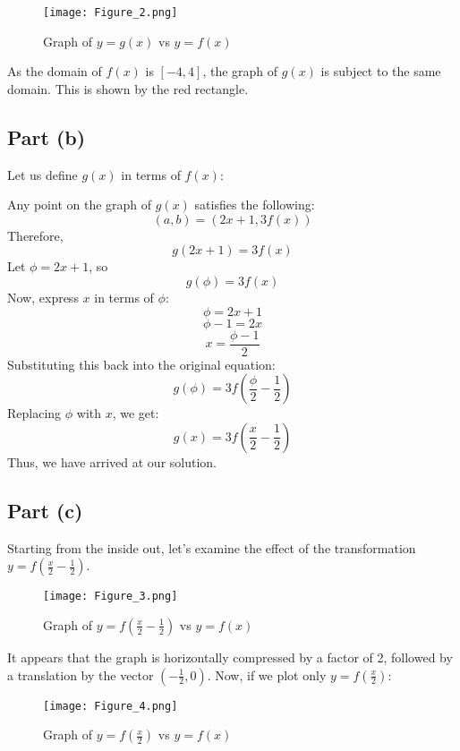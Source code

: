 \documentclass{article}
\begin{document}
\begin{figure}[H]
    \texttt{[image: Figure\_2.png]}
    \caption{Graph of $y = g(x)$ vs $y = f(x)$}
    \label{fig:Figure_2}
\end{figure}

As the domain of $f(x)$ is $[-4,4]$, the graph of $g(x)$ is subject to the same domain. This is shown by the red rectangle.

\subsection{Part (b)}
Let us define $g(x)$ in terms of $f(x)$:

\begin{center}
    Any point on the graph of $g(x)$ satisfies the following:
    \[
    (a,b) = (2x+1, 3f(x))
    \]
    Therefore, 
    \[
    g(2x+1) = 3f(x)
    \]
    Let $\phi = 2x+1$, so 
    \[
    g(\phi) = 3f(x)
    \]
    Now, express $x$ in terms of $\phi$:
    \[
    \phi = 2x+1
    \]
    \[
    \phi - 1 = 2x
    \]
    \[
    x = \frac{\phi - 1}{2}
    \]
    Substituting this back into the original equation:
    \[
    g(\phi) = 3f\left(\frac{\phi}{2} - \frac{1}{2}\right)
    \]
    Replacing $\phi$ with $x$, we get:
    \[
    g(x) = 3f\left(\frac{x}{2} - \frac{1}{2}\right)
    \]
    Thus, we have arrived at our solution.
\end{center}

\subsection{Part (c)}
Starting from the inside out, let's examine the effect of the transformation $ y = f\left(\frac{x}{2} - \frac{1}{2}\right)$.

\begin{figure}[H]
    \texttt{[image: Figure\_3.png]}
    \caption{Graph of $y = f\left(\frac{x}{2} - \frac{1}{2}\right)$ vs $y = f(x)$}
    \label{fig:Figure_3}
\end{figure}

It appears that the graph is horizontally compressed by a factor of 2, followed by a translation by the vector $(-\frac{1}{2}, 0)$. Now, if we plot only $y = f\left(\frac{x}{2}\right)$:

\begin{figure}[H]
    \texttt{[image: Figure\_4.png]}
    \caption{Graph of $y = f\left(\frac{x}{2}\right)$ vs $y = f(x)$}
    \label{fig:Figure_4}
\end{figure}
\end{document}
